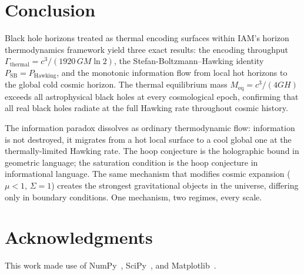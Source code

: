 \documentclass[12pt,a4paper]{article}
\begin{document}
\section{Conclusion}

Black hole horizons treated as thermal encoding surfaces within IAM's horizon
thermodynamics framework yield three exact results: the encoding throughput
$\Gamma_\mathrm{thermal} = c^3/(1920\,GM\ln 2)$, the Stefan-Boltzmann--Hawking
identity $P_\mathrm{SB} = P_\mathrm{Hawking}$, and the monotonic information flow
from local hot horizons to the global cold cosmic horizon. The thermal equilibrium
mass $M_\mathrm{eq} = c^3/(4GH)$ exceeds all astrophysical black holes at every
cosmological epoch, confirming that all real black holes radiate at the full
Hawking rate throughout cosmic history.

The information paradox dissolves as ordinary thermodynamic flow: information is
not destroyed, it migrates from a hot local surface to a cool global one at the
thermally-limited Hawking rate. The hoop conjecture is the holographic bound in
geometric language; the saturation condition is the hoop conjecture in
informational language. The same mechanism that modifies cosmic expansion
($\mu < 1$, $\Sigma = 1$) creates the strongest gravitational objects in the
universe, differing only in boundary conditions. One mechanism, two regimes,
every scale.

\section*{Acknowledgments}

This work made use of NumPy~\citep{Harris2020}, SciPy~\citep{Virtanen2020},
and Matplotlib~\citep{Hunter2007}.
\end{document}
